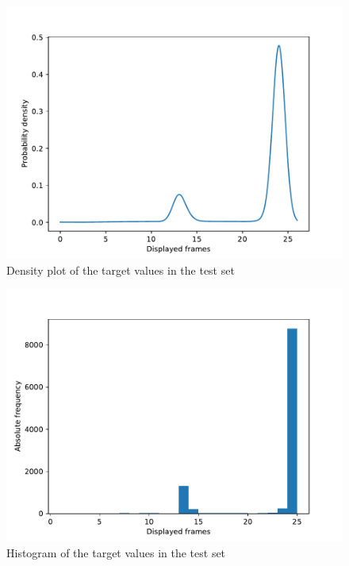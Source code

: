 \documentclass[]{article}
\begin{document}
\begin{enumerate}
        \begin{figure}
        \centering
        \includegraphics[width=\textwidth,height=0.25\textheight,keepaspectratio]{../result/project1/frames_density.pdf}
        \caption{Density plot of the target values in the test set}
        \end{figure}

        \begin{figure}
        \centering
        \includegraphics[width=\textwidth,height=0.25\textheight,keepaspectratio]{../result/project1/frames_hist.pdf}
        \caption{Histogram of the target values in the test set}
        \end{figure}


\end{enumerate}
\end{document}

